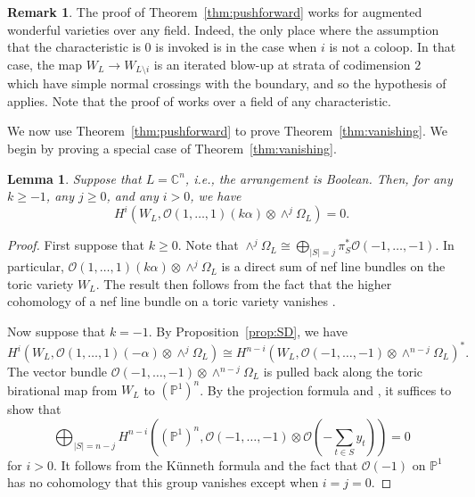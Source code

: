 \documentclass{amsart}
\newtheorem{lemma}[theorem]{Lemma}
\theoremstyle{definition}
\newtheorem{remark}[theorem]{Remark}
\begin{document}
\begin{remark}
The proof of Theorem~\ref{thm:pushforward} works for augmented wonderful varieties over any field. Indeed, the only place where the assumption that the characteristic is $0$ is invoked is in the case when $i$ is not a coloop. In that case, the map $W_L \to W_{L \setminus i}$ is an iterated blow-up at strata of codimension $2$ which have simple normal crossings with the boundary, and so the hypothesis of \cite[Proposition 31.3]{HodgeIdeals} applies. Note that the proof of \cite[Proposition 31.3]{HodgeIdeals} works over a field of any characteristic. 
\end{remark}


We now use Theorem~\ref{thm:pushforward} to prove Theorem~\ref{thm:vanishing}. We begin by proving a special case of Theorem~\ref{thm:vanishing}. 

\begin{lemma}\label{lem:boolean}
Suppose that $L = \mathbb{C}^n$, i.e., the arrangement is Boolean. Then, for any $k \ge -1$, any $j \ge 0$, and any $i > 0$, we have 
$$H^i(W_L, \mathcal{O}(1, \dotsc, 1)(k\alpha) \otimes \wedge^j \Omega_L) = 0.$$
\end{lemma}

\begin{proof}
First suppose that $k \ge 0$. Note that $\wedge^j \Omega_L \cong \bigoplus_{|S| = j} \pi_S^* \mathcal{O}(-1, \dotsc, -1)$. In particular, $\mathcal{O}(1, \dotsc, 1)(k\alpha) \otimes \wedge^j \Omega_L$ is a direct sum of nef line bundles on the toric variety $W_L$. The result then follows from the fact that the higher cohomology of a nef line bundle on a toric variety vanishes \cite[pg. 74]{Ful93}.

Now suppose that $k = -1$. By Proposition~\ref{prop:SD}, we have
$$H^i(W_L, \mathcal{O}(1, \dotsc, 1)(-\alpha) \otimes \wedge^j \Omega_L) \cong H^{n-i}(W_L, \mathcal{O}(-1, \dotsc, -1) \otimes \wedge^{n-j} \Omega_L)^*.$$
The vector bundle $\mathcal{O}(-1, \dotsc, -1) \otimes \wedge^{n-j} 
\Omega_L$ is pulled back along the toric birational map from $W_L$ to 
$(\mathbb{P}^1)^n$. By the projection formula and \cite[pg. 76]{Ful93}, 
it suffices to show that
$$\bigoplus_{|S| = n-j}H^{n-i}((\mathbb{P}^1)^n, \mathcal{O}(-1, \dotsc, -1) \otimes \mathcal{O}(-\sum_{t \in S} y_t)) = 0$$
for $i > 0$. It follows from the K\"{u}nneth formula and the fact that $\mathcal{O}(-1)$ on $\mathbb{P}^1$ has no cohomology that this group vanishes except when $i = j = 0$.  
\end{proof}
\end{document}
